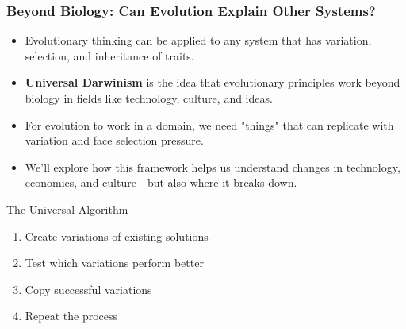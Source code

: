 \documentclass{beamer}
\begin{document}
	\begin{frame}
		\frametitle{Beyond Biology: Can Evolution Explain Other Systems?}
		\begin{itemize}
			\item Evolutionary thinking can be applied to any system that has variation, selection, and inheritance of traits.
			\item \textbf{Universal Darwinism} is the idea that evolutionary principles work beyond biology in fields like technology, culture, and ideas.
			\item For evolution to work in a domain, we need "things" that can replicate with variation and face selection pressure.
			\item We'll explore how this framework helps us understand changes in technology, economics, and culture—but also where it breaks down.
		\end{itemize}
		\begin{block}{The Universal Algorithm}
			\begin{enumerate}
				\item Create variations of existing solutions
				\item Test which variations perform better
				\item Copy successful variations
				\item Repeat the process
			\end{enumerate}
		\end{block}
	\end{frame}
	
\end{document}
